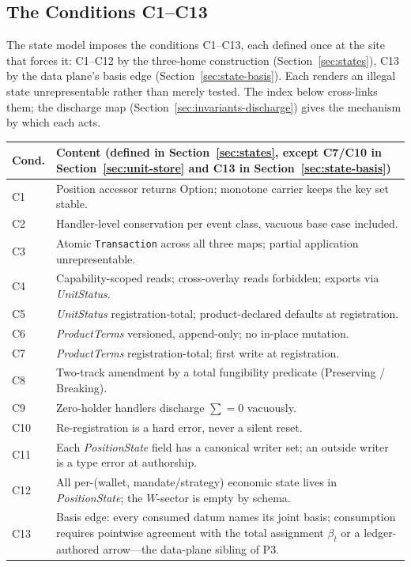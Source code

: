 \documentclass[11pt,a4paper]{article}
\begin{document}
\subsection{The Conditions C1--C13}
\label{sec:invariants-conditions}

The state model imposes the conditions C1--C13, each defined once at the site that forces it: C1--C12 by the three-home construction (Section~\ref{sec:states}), C13 by the data plane's basis edge (Section~\ref{sec:state-basis}). Each renders an illegal state unrepresentable rather than merely tested. The index below cross-links them; the discharge map (Section~\ref{sec:invariants-discharge}) gives the mechanism by which each acts.

\begin{center}
\small
\begin{longtable}{@{}p{1cm}p{10.4cm}@{}}
\toprule
\textbf{Cond.} & \textbf{Content (defined in Section~\ref{sec:states}, except C7/C10 in Section~\ref{sec:unit-store} and C13 in Section~\ref{sec:state-basis})} \\
\midrule
\endhead
C1 & Position accessor returns Option; monotone carrier keeps the key set stable. \\
C2 & Handler-level conservation per event class, vacuous base case included. \\
C3 & Atomic \texttt{Transaction} across all three maps; partial application unrepresentable. \\
C4 & Capability-scoped reads; cross-overlay reads forbidden; exports via \emph{UnitStatus}. \\
C5 & \emph{UnitStatus} registration-total; product-declared defaults at registration. \\
C6 & \emph{ProductTerms} versioned, append-only; no in-place mutation. \\
C7 & \emph{ProductTerms} registration-total; first write at registration. \\
C8 & Two-track amendment by a total fungibility predicate (Preserving / Breaking). \\
C9 & Zero-holder handlers discharge $\sum=0$ vacuously. \\
C10 & Re-registration is a hard error, never a silent reset. \\
C11 & Each \emph{PositionState} field has a canonical writer set; an outside writer is a type error at authorship. \\
C12 & All per-(wallet, mandate/strategy) economic state lives in \emph{PositionState}; the $W$-sector is empty by schema. \\
C13 & Basis edge: every consumed datum names its joint basis; consumption requires pointwise agreement with the total assignment $\beta_t$ or a ledger-authored arrow---the data-plane sibling of P3. \\
\bottomrule
\end{longtable}
\end{center}
\end{document}
